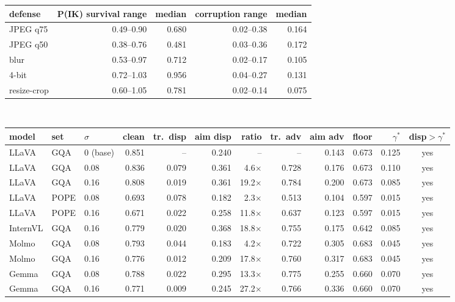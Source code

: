 \small
\setlength{\tabcolsep}{6pt}
\begin{tabular}{@{}lrrrr@{}}
\toprule
defense & P(IK) survival range & median & corruption range & median \\
\midrule
JPEG q75 & 0.49--0.90 & 0.680 & 0.02--0.38 & 0.164 \\
JPEG q50 & 0.38--0.76 & 0.481 & 0.03--0.36 & 0.172 \\
blur & 0.53--0.97 & 0.712 & 0.02--0.17 & 0.105 \\
4-bit & 0.72--1.03 & 0.956 & 0.04--0.27 & 0.131 \\
resize-crop & 0.60--1.05 & 0.781 & 0.02--0.14 & 0.075 \\
\bottomrule
\end{tabular}

\vspace{3pt}

\vspace{8pt}
\\[2pt]
\small
\setlength{\tabcolsep}{4pt}
\begin{tabular}{@{}lll r rr r rr r r c@{}}
\toprule
model & set & $\sigma$ & clean & tr.\ disp & aim disp & ratio & tr.\ adv & aim adv & floor & $\gamma^{\ast}$ & disp$>\gamma^{\ast}$ \\
\midrule
LLaVA & GQA & 0 (base) & 0.851 & -- & 0.240 & -- & -- & 0.143 & 0.673 & 0.125 & yes \\
LLaVA & GQA & 0.08 & 0.836 & 0.079 & 0.361 & 4.6$\times$ & 0.728 & 0.176 & 0.673 & 0.110 & yes \\
LLaVA & GQA & 0.16 & 0.808 & 0.019 & 0.361 & 19.2$\times$ & 0.784 & 0.200 & 0.673 & 0.085 & yes \\
LLaVA & POPE & 0.08 & 0.693 & 0.078 & 0.182 & 2.3$\times$ & 0.513 & 0.104 & 0.597 & 0.015 & yes \\
LLaVA & POPE & 0.16 & 0.671 & 0.022 & 0.258 & 11.8$\times$ & 0.637 & 0.123 & 0.597 & 0.015 & yes \\
InternVL & GQA & 0.16 & 0.779 & 0.020 & 0.368 & 18.8$\times$ & 0.755 & 0.175 & 0.642 & 0.085 & yes \\
Molmo & GQA & 0.08 & 0.793 & 0.044 & 0.183 & 4.2$\times$ & 0.722 & 0.305 & 0.683 & 0.045 & yes \\
Molmo & GQA & 0.16 & 0.776 & 0.012 & 0.209 & 17.8$\times$ & 0.760 & 0.317 & 0.683 & 0.045 & yes \\
Gemma & GQA & 0.08 & 0.788 & 0.022 & 0.295 & 13.3$\times$ & 0.775 & 0.255 & 0.660 & 0.070 & yes \\
Gemma & GQA & 0.16 & 0.771 & 0.009 & 0.245 & 27.2$\times$ & 0.766 & 0.336 & 0.660 & 0.070 & yes \\
\bottomrule
\end{tabular}
